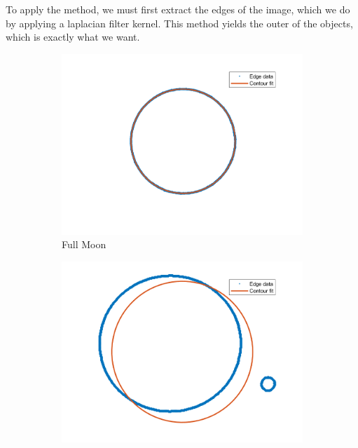 To apply the method, we must first extract the edges of the image, which we do by applying a laplacian filter kernel. This method yields the outer of the objects, which is exactly what we want.

\begin{figure}[!ht]
    \centering
    \begin{subfigure}{0.32\textwidth}
        \centering
        \includegraphics[width=\textwidth]{Doc/Graphics/Part3/contourDection_pseudoInverse_moon.png}
        \caption{Full Moon}
    \end{subfigure}
    \begin{subfigure}{0.32\textwidth}
        \centering
        \includegraphics[width=\textwidth]{Doc/Graphics/Part3/contourDection_pseudoInverse_jupiter_earth.png}

\end{subfigure}
\end{figure}
